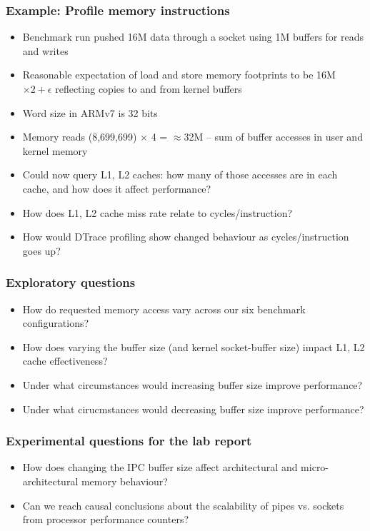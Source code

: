 \begin{frame}
  \frametitle{Example: Profile memory instructions}

  \begin{itemize}
    \item Benchmark run pushed 16M data through a socket using 1M buffers
      for reads and writes
    \item Reasonable expectation of load and store memory footprints to be
      16M $\times 2 + \epsilon$ reflecting copies to and from kernel buffers

    \pause
    \bigskip

    \item Word size in ARMv7 is 32 bits
    \item Memory reads (8,699,699) $\times$ 4 = $\approx$32M -- sum of buffer
      accesses in user and kernel memory

    \pause
    \bigskip

    \item Could now query L1, L2 caches: how many of those accesses are in
      each cache, and how does it affect performance?
    \item How does L1, L2 cache miss rate relate to cycles/instruction?
    \item How would DTrace profiling show changed behaviour as
      cycles/instruction goes up?
  \end{itemize}
\end{frame}

\begin{frame}
  \frametitle{Exploratory questions}

  \begin{itemize}
    \item How do requested memory access vary across our six benchmark
      configurations?
    \item How does varying the buffer size (and kernel socket-buffer size)
      impact L1, L2 cache effectiveness?
    \item Under what circumstances would increasing buffer size improve
      performance?
    \item Under what cirucmstances would decreasing buffer size improve
      performance?
  \end{itemize}
\end{frame}

\begin{frame}
  \frametitle{Experimental questions for the lab report}

  \begin{itemize}
    \item How does changing the IPC buffer size affect architectural and
      micro-architectural memory behaviour?
    \item Can we reach causal conclusions about the scalability of pipes vs.
      sockets from processor performance counters?
  \end{itemize}
\end{frame}

